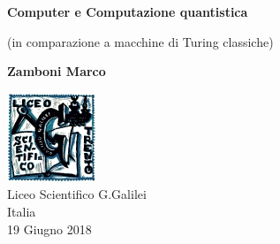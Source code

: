 \documentclass[10pt]{report}
\begin{document}
    \begin{center}
        \vspace*{1cm}
        
        \Huge
        \textbf{Computer e Computazione quantistica}
        
        \vspace{0.5cm}
		\LARGE        
        (in comparazione a macchine di Turing classiche)
        
        \vspace{1.5cm}
        \huge
        \textbf{Zamboni Marco}
        
        \vfill
        
		\includegraphics[scale=1]{logoG}\\		
		\vspace{1.0cm}		
		\Large        
        Liceo Scientifico G.Galilei\\
        Italia\\
        19 Giugno 2018
        
    \end{center}
\end{document}
